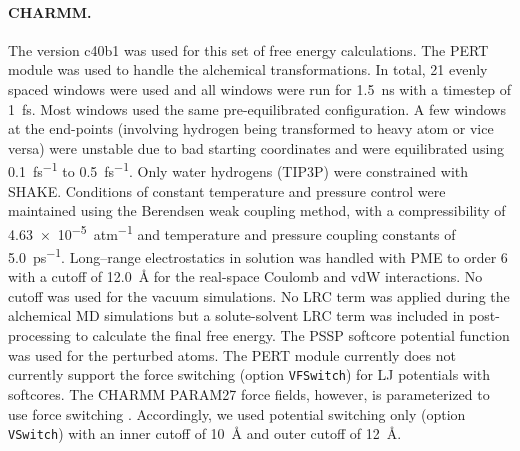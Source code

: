 \documentclass[journal=jctcce,manuscript=article]{achemso}
\newcommand{\inpopt}[1]{\texttt{#1}}
\begin{document}
\paragraph{CHARMM.} 
The version c40b1 was used for this set of free energy calculations.  
The PERT module was used to handle the alchemical transformations. 
%
In total, 21 evenly spaced windows were used and all windows were run for \SI{1.5}{ns} with a timestep of \SI{1}{fs}.  
Most windows used the same pre-equilibrated configuration. 
A few windows at the end-points (involving hydrogen being transformed to heavy atom or vice versa) were unstable due to bad starting coordinates and were equilibrated using \SI{0.1}{fs^{-1}} to \SI{0.5}{fs^{-1}}.
%
Only water hydrogens (TIP3P) were constrained with SHAKE. 
%
Conditions of constant temperature and pressure control were maintained using the Berendsen weak coupling method, 
with a compressibility of \SI{4.63e-5}{atm^{-1}} and temperature and pressure coupling constants of \SI{5.0}{ps^{-1}}.  
%
Long--range electrostatics in solution was handled with PME to order 6 with a cutoff of \SI{12.0}{\angstrom} for the real-space Coulomb and vdW interactions. 
No cutoff was used for the vacuum simulations.
%
{\color{blue} No LRC term was applied during the alchemical MD simulations but a solute-solvent LRC term was included in post-processing to calculate the final free energy. }
%
The PSSP softcore potential function was used for the perturbed atoms. 
The PERT module currently does not currently support the force switching (option \inpopt{VFSwitch}) for LJ potentials with softcores.  
The CHARMM PARAM27 force fields, however, is parameterized to use force switching \cite{JCC:JCC21287}. 
Accordingly, we used potential switching only (option \inpopt{VSwitch}) with an inner cutoff of \SI{10}{\angstrom} and outer cutoff of \SI{12}{\angstrom}.
\end{document}
